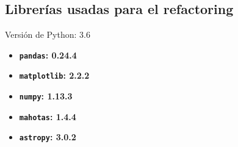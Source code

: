 
\begin{appendix}

\section{Librer\'ias usadas para el refactoring}
\label{subs:a0}
Versi\'on de Python: 3.6
\begin{itemize}
\item \textbf{\texttt{pandas}: 0.24.4}
\item \textbf{\texttt{matplotlib}: 2.2.2}
\item \textbf{\texttt{numpy}: 1.13.3}
\item \textbf{\texttt{mahotas}: 1.4.4}
\item \textbf{\texttt{astropy}: 3.0.2}
\end{itemize}
\pagebreak


\end{appendix}
